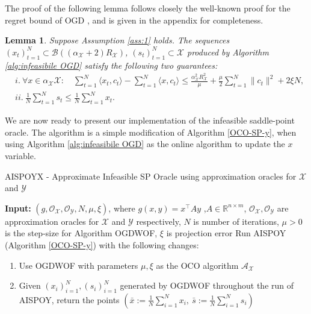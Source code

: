 \documentclass[a4paper,12pt]{article}
\newtheorem{lemma} {Lemma}
\newcommand{\mY}{\mathcal{Y}}
\newcommand{\mX}{\mathcal{X}}
\newcommand{\mA}{\mathcal{A}}
\newcommand{\mB}{\mathcal{B}}
\newcommand{\reals}{\mathbb{R}}
\newcommand{\oraclex}{\mathcal{O}_{\mX}}
\newcommand{\oracley}{\mathcal{O}_{\mY}}
\begin{document}
The proof of the following lemma follows closely the well-known proof for the regret bound of OGD \cite{zinkevich2003online}, and is given in the appendix for completeness.
\begin{lemma}
\label{lemma:infeasibile OGD}
Suppose Assumption \ref{ass:1} holds. The sequences $(x_t)_{t=1}^N\subset\mB((\alpha_{\mX}+2)R_{\mX})$, $(s_t)_{t=1}^N\subset\mX$ produced by Algorithm \ref{alg:infeasibile OGD} satisfy the following two guarantees:
\begin{align*}
&i.~ \forall x \in \alpha_\mX \mX: \quad \sum_{t=1}^N \langle x_t,c_t \rangle -\sum_{t=1}^N \langle x,c_t \rangle \leq  \frac{\alpha_{\mX}^2R_{\mX}^2}{\mu }  +\frac{\mu }{2} \sum_{t=1}^N \|c_t\|^2 + 2\xi N, \\
&ii.~  \frac{1}{N}\sum_{t=1}^Ns_t \leq \frac{1}{N}\sum_{t=1}^N x_t.
\end{align*}
\end{lemma}

 
We are now ready to present our implementation of the infeasible saddle-point oracle. The algorithm is a simple modification of  Algorithm \ref{OCO-SP-y}, when using Algorithm \ref{alg:infeasibile OGD} as the online algorithm to update the $x$ variable.
 \begin{algorithm}[H]
\begin{algorithmic}[1]
\caption{AISPOYX - Approximate Infeasible SP Oracle using approximation oracles for $\mX$ and $\mY$ }\label{OCO-SP-xy}
\STATE \textbf{Input:} $(g,\oraclex, \oracley ,N, \mu, \xi)$, where $g(x,y)=x^\top A y$ ,$A\in \reals^{n\times m}$, $\oraclex, \oracley$ are approximation oracles for $\mX$ and $\mY$ respectively, $N$ is number of iterations, $\mu > 0$ is the step-size for Algorithm  OGDWOF, $\xi$ is projection error 
\STATE Run AISPOY (Algorithm \ref{OCO-SP-y}) with the following changes: 
\begin{enumerate}
\item
Use OGDWOF with parameters $\mu,\xi$ as the OCO algorithm $\mA_{\mX}$
\item
Given $(x_i)_{i=1}^N, (s_i)_{i=1}^N$ generated by  OGDWOF throughout the run of AISPOY, return the points $\left({\bar{x} := \frac{1}{N}\sum_{i=1}^Nx_i, ~\bar{s} := \frac{1}{N}\sum_{i=1}^Ns_i}\right)$%
\end{enumerate}
\end{algorithmic}
\end{algorithm}
\end{document}
